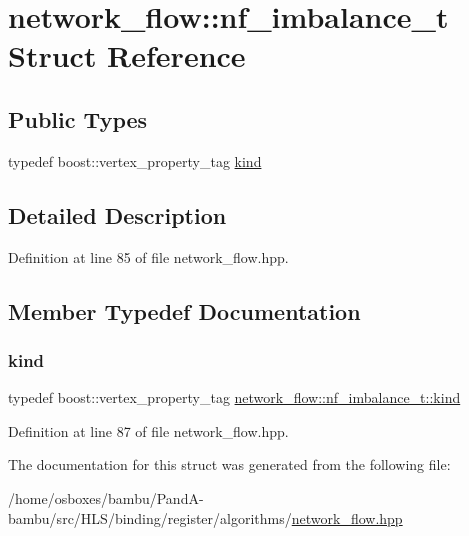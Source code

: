 \hypertarget{structnetwork__flow_1_1nf__imbalance__t}{}\section{network\+\_\+flow\+:\+:nf\+\_\+imbalance\+\_\+t Struct Reference}
\label{structnetwork__flow_1_1nf__imbalance__t}
\subsection*{Public Types}
\begin{DoxyCompactItemize}
\item 
typedef boost\+::vertex\+\_\+property\+\_\+tag \hyperlink{structnetwork__flow_1_1nf__imbalance__t_a7c8a6f0fa4785cedb5c865b2998af796}{kind}
\end{DoxyCompactItemize}


\subsection{Detailed Description}


Definition at line 85 of file network\+\_\+flow.\+hpp.



\subsection{Member Typedef Documentation}
\mbox{\label{structnetwork__flow_1_1nf__imbalance__t_a7c8a6f0fa4785cedb5c865b2998af796}} 
\subsubsection{\texorpdfstring{kind}{kind}}
{\footnotesize\ttfamily typedef boost\+::vertex\+\_\+property\+\_\+tag \hyperlink{structnetwork__flow_1_1nf__imbalance__t_a7c8a6f0fa4785cedb5c865b2998af796}{network\+\_\+flow\+::nf\+\_\+imbalance\+\_\+t\+::kind}}



Definition at line 87 of file network\+\_\+flow.\+hpp.



The documentation for this struct was generated from the following file\+:\begin{DoxyCompactItemize}
\item 
/home/osboxes/bambu/\+Pand\+A-\/bambu/src/\+H\+L\+S/binding/register/algorithms/\hyperlink{network__flow_8hpp}{network\+\_\+flow.\+hpp}\end{DoxyCompactItemize}

